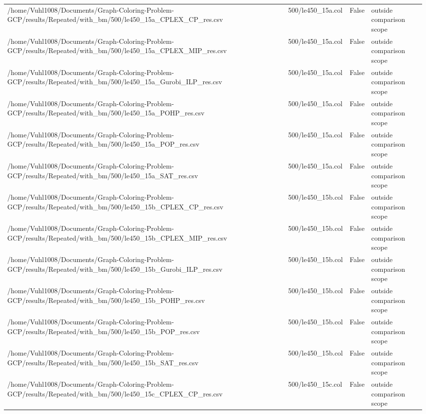 \begin{table}[htbp]
\begin{tabular}{llll}
/home/Vuhl1008/Documents/Graph-Coloring-Problem-GCP/results/Repeated/with\_bm/500/le450\_15a\_CPLEX\_CP\_res.csv & 500/le450\_15a.col & False & outside comparison scope \\
/home/Vuhl1008/Documents/Graph-Coloring-Problem-GCP/results/Repeated/with\_bm/500/le450\_15a\_CPLEX\_MIP\_res.csv & 500/le450\_15a.col & False & outside comparison scope \\
/home/Vuhl1008/Documents/Graph-Coloring-Problem-GCP/results/Repeated/with\_bm/500/le450\_15a\_Gurobi\_ILP\_res.csv & 500/le450\_15a.col & False & outside comparison scope \\
/home/Vuhl1008/Documents/Graph-Coloring-Problem-GCP/results/Repeated/with\_bm/500/le450\_15a\_POHP\_res.csv & 500/le450\_15a.col & False & outside comparison scope \\
/home/Vuhl1008/Documents/Graph-Coloring-Problem-GCP/results/Repeated/with\_bm/500/le450\_15a\_POP\_res.csv & 500/le450\_15a.col & False & outside comparison scope \\
/home/Vuhl1008/Documents/Graph-Coloring-Problem-GCP/results/Repeated/with\_bm/500/le450\_15a\_SAT\_res.csv & 500/le450\_15a.col & False & outside comparison scope \\
/home/Vuhl1008/Documents/Graph-Coloring-Problem-GCP/results/Repeated/with\_bm/500/le450\_15b\_CPLEX\_CP\_res.csv & 500/le450\_15b.col & False & outside comparison scope \\
/home/Vuhl1008/Documents/Graph-Coloring-Problem-GCP/results/Repeated/with\_bm/500/le450\_15b\_CPLEX\_MIP\_res.csv & 500/le450\_15b.col & False & outside comparison scope \\
/home/Vuhl1008/Documents/Graph-Coloring-Problem-GCP/results/Repeated/with\_bm/500/le450\_15b\_Gurobi\_ILP\_res.csv & 500/le450\_15b.col & False & outside comparison scope \\
/home/Vuhl1008/Documents/Graph-Coloring-Problem-GCP/results/Repeated/with\_bm/500/le450\_15b\_POHP\_res.csv & 500/le450\_15b.col & False & outside comparison scope \\
/home/Vuhl1008/Documents/Graph-Coloring-Problem-GCP/results/Repeated/with\_bm/500/le450\_15b\_POP\_res.csv & 500/le450\_15b.col & False & outside comparison scope \\
/home/Vuhl1008/Documents/Graph-Coloring-Problem-GCP/results/Repeated/with\_bm/500/le450\_15b\_SAT\_res.csv & 500/le450\_15b.col & False & outside comparison scope \\
/home/Vuhl1008/Documents/Graph-Coloring-Problem-GCP/results/Repeated/with\_bm/500/le450\_15c\_CPLEX\_CP\_res.csv & 500/le450\_15c.col & False & outside comparison scope \\

\end{tabular}
\end{table}
